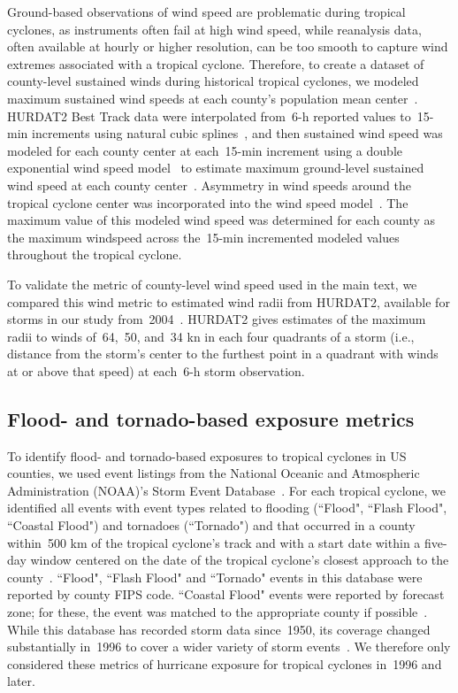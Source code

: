 Ground-based observations of wind speed are problematic during tropical
cyclones, as instruments often fail at high wind speed, while reanalysis data,
often available at hourly or higher resolution, can be too smooth to capture
wind extremes associated with a tropical cyclone. Therefore, to create a
dataset of county-level sustained winds during historical tropical cyclones, we
modeled maximum sustained wind speeds at each county's population mean
center~\citep{countycenters}. \ac{HURDAT2} Best Track data were interpolated
from~6-\si{\hour} reported values to~15-\si{\minute} increments using natural cubic
splines~\citep{stormwindmodel}, and then sustained wind speed was modeled for
each county center at each~15-\si{\minute} increment using a double exponential wind
speed model~\citep{willoughby2006parametric} to estimate maximum ground-level
sustained wind speed at each county center~\citep{stormwindmodel}. Asymmetry in
wind speeds around the tropical cyclone center was incorporated into the wind
speed model~\citep{phadke2003modeling, stormwindmodel}. The maximum value of
this modeled wind speed was determined for each county as the maximum windspeed
across the~15-\si{\minute} incremented modeled values throughout the tropical
cyclone.

To validate the metric of county-level wind speed used in the main text, we
compared this wind metric to estimated wind radii from \ac{HURDAT2}, available
for storms in our study from~2004~\citep{landsea2013}. \ac{HURDAT2} gives
estimates of the maximum radii to winds of~64,~50, and~34 \si{\knot} in each four
quadrants of a storm (i.e., distance from the storm's center to the furthest
point in a quadrant with winds at or above that speed) at each~6-\si{\hour} storm
observation. 

\subsection*{Flood- and tornado-based exposure metrics}

To identify flood- and tornado-based exposures to tropical cyclones in \ac{US}
counties, we used event listings from the National Oceanic and Atmospheric
Administration (NOAA)'s Storm Event Database~\citep{stormevents}. For each
tropical cyclone, we identified all events with event types related to flooding
(``Flood", ``Flash Flood", ``Coastal Flood") and tornadoes (``Tornado") and
that occurred in a county within~500 \si{\kilo\metre} of the tropical cyclone's track
and with a start date within a five-day window centered on the date of the
tropical cyclone's closest approach to the
county~\citep{hurricaneexposuredata}. ``Flood", ``Flash Flood" and ``Tornado"
events in this database were reported by county \ac{FIPS} code. ``Coastal
Flood" events were reported by forecast zone; for these, the event was matched
to the appropriate county if possible~\citep{noaastormevents}. While this
database has recorded storm data since~1950, its coverage changed substantially
in~1996 to cover a wider variety of storm events~\citep{stormevents}. We
therefore only considered these metrics of hurricane exposure for tropical
cyclones in~1996 and later.

